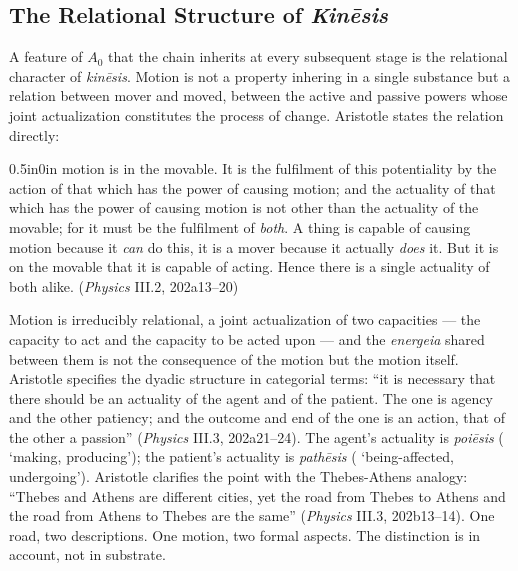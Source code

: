 \subsection{The Relational Structure of \textit{Kinēsis}}

A feature of $A_0$ that the chain inherits at every subsequent stage is the relational character of \textit{kinēsis}. Motion is not a property inhering in a single substance but a relation between mover and moved, between the active and passive powers whose joint actualization constitutes the process of change. Aristotle states the relation directly:
\begin{adjustwidth}{0.5in}{0in}
motion is in the movable. It is the fulfilment of this potentiality by the action of that which has the power of causing motion; and the actuality of that which has the power of causing motion is not other than the actuality of the movable; for it must be the fulfilment of \textit{both}. A thing is capable of causing motion because it \textit{can} do this, it is a mover because it actually \textit{does} it. But it is on the movable that it is capable of acting. Hence there is a single actuality of both alike. (\textit{Physics} III.2, 202a13--20)
\end{adjustwidth}
Motion is irreducibly relational, a joint actualization of two capacities --- the capacity to act and the capacity to be acted upon --- and the \textit{energeia} shared between them is not the consequence of the motion but the motion itself. Aristotle specifies the dyadic structure in categorial terms: ``it is necessary that there should be an actuality of the agent and of the patient. The one is agency and the other patiency; and the outcome and end of the one is an action, that of the other a passion'' (\textit{Physics} III.3, 202a21--24). The agent's actuality is \textit{poiēsis} ( `making, producing'); the patient's actuality is \textit{pathēsis} ( `being-affected, undergoing'). Aristotle clarifies the point with the Thebes-Athens analogy: ``Thebes and Athens are different cities, yet the road from Thebes to Athens and the road from Athens to Thebes are the same'' (\textit{Physics} III.3, 202b13--14). One road, two descriptions. One motion, two formal aspects. The distinction is in account, not in substrate.


